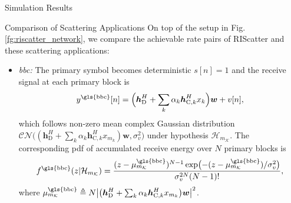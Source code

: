 \documentclass[journal]{IEEEtran}
\begin{document}
\begin{section}{Simulation Results}
\begin{subsection}{Comparison of Scattering Applications}
		On top of the setup in Fig. \ref{fg:riscatter_network}, we compare the achievable rate pairs of RIScatter and these scattering applications:
		\begin{itemize}
			\item \emph{\gls{bbc}:}
			The primary symbol becomes deterministic $s[n]=1$ and the receive signal at each primary block is
			\begin{equation}
				y^{\text{\gls{bbc}}}[n] = \Bigl(\boldsymbol{h}_{\mathrm{D}}^H + \sum_{k} \alpha_k \boldsymbol{h}_{\mathrm{C},k}^H x_k\Bigr) \boldsymbol{w} + v[n],
			\end{equation}
			which follows non-zero mean complex Gaussian distribution $\mathcal{CN}\bigl((\boldsymbol{h}_{\mathrm{D}}^H + \sum_{k} \alpha_k \boldsymbol{h}_{\mathrm{C},k}^H x_{m_k}) \boldsymbol{w},\sigma_v^2\bigr)$ under hypothesis $\mathcal{H}_{m_{\mathcal{K}}}$.
			The corresponding \gls{pdf} of accumulated receive energy over $N$ primary blocks is
			\begin{equation}
				f^{\text{\gls{bbc}}}(z|\mathcal{H}_{m_{\mathcal{K}}}) = \frac{(z-\mu_{m_{\mathcal{K}}}^{\text{\gls{bbc}}})^{N-1} \exp \bigl(-(z-\mu_{m_{\mathcal{K}}}^{\text{\gls{bbc}}})/\sigma_v^2 \bigr)}{\sigma_v^{2N} (N-1)!},
				\label{eq:energy_distribution_bbc}
			\end{equation}
			where $\mu_{m_{\mathcal{K}}}^{\text{\gls{bbc}}} \triangleq N \bigl\lvert \bigl(\boldsymbol{h}_{\mathrm{D}}^H + \sum_{k} \alpha_k \boldsymbol{h}_{\mathrm{C},k}^H x_{m_k}\bigr) \boldsymbol{w} \bigr\rvert^2$.

\end{itemize}
\end{subsection}
\end{section}
\end{document}
